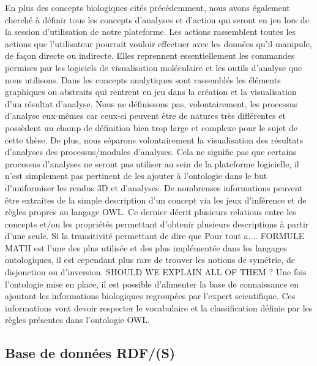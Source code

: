 En plus des concepts biologiques cités précédemment, nous avons également cherché à définir tous les concepts d'analyses et d'action qui seront en jeu lors de la session d'utilisation de notre plateforme. Les actions rassemblent toutes les actions que l'utilisateur pourrait vouloir effectuer avec les données qu'il manipule, de façon directe ou indirecte. Elles reprennent essentiellement les commandes permises par les logiciels de visualisation moléculaire et les outils d'analyse que nous utilisons. Dans les concepts analytiques sont rassemblés les éléments graphiques ou abstraits qui rentrent en jeu dans la création et la visualisation d'un résultat d'analyse. Nous ne définissons pas, volontairement, les processus d'analyse eux-mêmes car ceux-ci peuvent être de natures très différentes et possèdent un champ de définition bien trop large et complexe pour le sujet de cette thèse. De plus, nous séparons volontairement la visualisation des résultats d'analyses des processus/modules d'analyses. Cela ne signifie pas que certains processus d'analyses ne seront pas utiliser au sein de la plateforme logicielle, il n'est simplement pas pertinent de les ajouter à l'ontologie dans le but d'uniformiser les rendus 3D et d'analyses.
De nombreuses informations peuvent être extraites de la simple description d'un concept via les jeux d'inférence et de règles propres au langage OWL. Ce dernier décrit plusieurs relations entre les concepts et/ou les propriétés permettant d'obtenir plusieurs descriptions à partir d'une seule. Si la transitivité permettant de dire que {{Pour tout a.... FORMULE MATH}} est l'une des plus utilisée et des plus implémentée dans les langages ontologiques, il est cependant plus rare de trouver les notions de symétrie, de disjonction ou d'inversion. SHOULD WE EXPLAIN ALL OF THEM ?
Une fois l'ontologie mise en place, il est possible d'alimenter la base de connaissance en ajoutant les informations biologiques regroupées par l'expert scientifique. Ces informations vont devoir respecter le vocabulaire et la classification définie par les règles présentes dans l'ontologie OWL.

\subsection{Base de données RDF/(S)}

